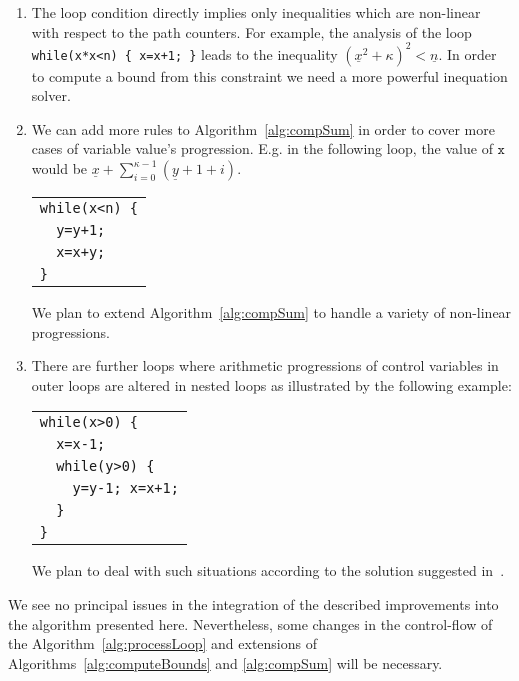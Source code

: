 \documentclass[10pt,a4paper]{article}
\newcommand{\var}[1]{\texttt{#1}}
\newcommand{\sym}[1]{\ensuremath{\underline{#1}}}
\begin{document}
\begin{enumerate}
\item The loop condition directly implies only inequalities which are non-linear
with respect to the path counters. For example, the analysis of the
  loop \texttt{while(x*x<n)\,\{\,x=x+1;\,\}}
leads to the inequality $(\sym{x}^2+\kappa)^2<\sym{n}$. In order to
 compute a bound from this constraint we need a more powerful inequation
 solver.

\item We can add more rules to Algorithm~\ref{alg:compSum} in order to 
  cover more cases of variable value's progression. E.g. in the following loop, the value of
  $\var{x}$ would be $\sym{x} + \sum_{i=0}^{\kappa-1} (\sym{y}+1+i)$.


  \begin{center}
  \begin{tabular}{l}
    \texttt{while(x<n)~\{}\\
    \texttt{~~y=y+1;}\\
    \texttt{~~x=x+y;}\\
    \texttt{\}}\\
  \end{tabular} 
  \end{center} 
  We plan to extend Algorithm~\ref{alg:compSum} to handle a variety of
  non-linear progressions.

\item There are further loops where arithmetic progressions of control
  variables in outer loops are altered in nested loops as illustrated
  by the following example:
  \begin{center}
  \begin{tabular}{l}
    \texttt{while(x>0)~\{}\\
    \texttt{~~x=x-1;}\\
    \texttt{~~while(y>0)~\{}\\
    \texttt{~~~~y=y-1;~x=x+1;}\\
    \texttt{~~\}}\\
    \texttt{\}}
  \end{tabular}
  \end{center}
We plan to deal with such situations according to the solution
  suggested in~\cite{Loopus2014}.
\end{enumerate}
We see no principal issues in the integration of the described
improvements into the algorithm presented here. Nevertheless, some changes in
the control-flow of the Algorithm~\ref{alg:processLoop} and extensions of
Algorithms~\ref{alg:computeBounds} and \ref{alg:compSum} will be necessary.
\end{document}
